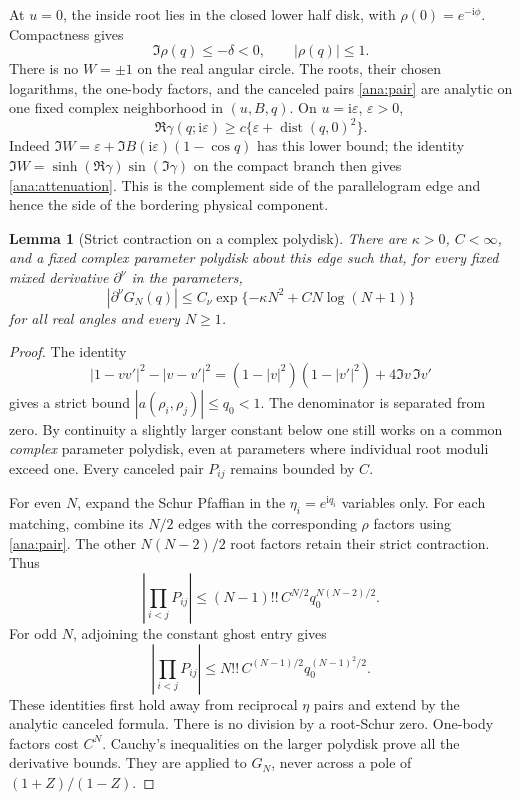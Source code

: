 \documentclass[11pt]{article}
\numberwithin{equation}{section}
\newtheorem{lemma}[theorem]{Lemma}
\theoremstyle{definition}
\newcommand{\ii}{\mathrm i}
\newcommand{\eps}{\varepsilon}
\begin{document}
At \(u=0\), the inside root lies in the closed lower half disk,
with \(\rho(0)=e^{-\ii\phi}\). Compactness gives
\[
 \Im\rho(q)\le-\delta<0,\qquad |\rho(q)|\le1.
\]
There is no \(W=\pm1\) on the real angular circle. The roots,
their chosen logarithms, the one-body factors, and the canceled
pairs \eqref{ana:pair} are analytic on one fixed complex
neighborhood in \((u,B,q)\). On \(u=\ii\eps\), \(\eps>0\),
\begin{equation}\label{ana:attenuation}
 \Re\gamma(q;\ii\eps)
   \ge c\{\eps+\operatorname{dist}(q,0)^2\}.
\end{equation}
Indeed
\(\Im W=\eps+\Im B(\ii\eps)(1-\cos q)\) has this lower bound;
the identity
\(\Im W=\sinh(\Re\gamma)\sin(\Im\gamma)\) on the compact branch
then gives \eqref{ana:attenuation}. This is the complement side
of the parallelogram edge and hence the side of the bordering
physical component.

\begin{lemma}[Strict contraction on a complex polydisk]
\label{ana:matching}
There are \(\kappa>0\), \(C<\infty\), and a fixed complex parameter
polydisk about this edge such that, for every fixed mixed derivative
\(\partial^\nu\) in the parameters,
\begin{equation}\label{ana:gaussian}
 |\partial^\nu G_N(q)|
 \le C_\nu\exp\{-\kappa N^2+C N\log(N+1)\}
\end{equation}
for all real angles and every \(N\ge1\).
\end{lemma}
\begin{proof}
The identity
\[
 |1-vv'|^2-|v-v'|^2
 =(1-|v|^2)(1-|v'|^2)+4\Im v\,\Im v'
\]
gives a strict bound \(|a(\rho_i,\rho_j)|\le q_0<1\).
The denominator is separated from zero. By continuity a slightly
larger constant below one still works on a common \emph{complex}
parameter polydisk, even at parameters where individual root moduli
exceed one. Every canceled pair \(P_{ij}\) remains bounded by \(C\).

For even \(N\), expand the Schur Pfaffian in the
\(\eta_i=e^{\ii q_i}\) variables only. For each matching, combine
its \(N/2\) edges with the corresponding \(\rho\) factors using
\eqref{ana:pair}. The other \(N(N-2)/2\) root factors retain their
strict contraction. Thus
\[
 \left|\prod_{i<j}P_{ij}\right|
 \le(N-1)!!\,C^{N/2}q_0^{N(N-2)/2}.
\]
For odd \(N\), adjoining the constant ghost entry gives
\[
 \left|\prod_{i<j}P_{ij}\right|
 \le N!!\,C^{(N-1)/2}q_0^{(N-1)^2/2}.
\]
These identities first hold away from reciprocal \(\eta\) pairs and
extend by the analytic canceled formula. There is no division by
a root-Schur zero. One-body factors cost \(C^N\).
Cauchy's inequalities on the larger polydisk prove all the derivative
bounds. They are applied to \(G_N\), never across a pole of
\((1+Z)/(1-Z)\).
\end{proof}
\end{document}
